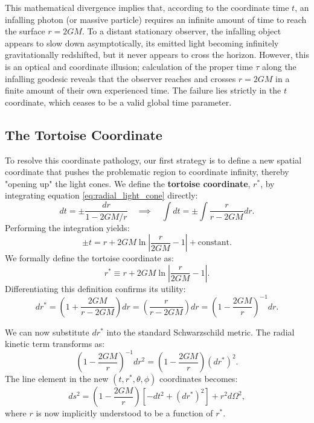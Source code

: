 \documentclass[11pt, a4paper]{report}
\begin{document}
This mathematical divergence implies that, according to the coordinate time $t$, an infalling photon (or massive particle) requires an infinite amount of time to reach the surface $r = 2GM$. To a distant stationary observer, the infalling object appears to slow down asymptotically, its emitted light becoming infinitely gravitationally redshifted, but it never appears to cross the horizon. However, this is an optical and coordinate illusion; calculation of the proper time $\tau$ along the infalling geodesic reveals that the observer reaches and crosses $r = 2GM$ in a finite amount of their own experienced time. The failure lies strictly in the $t$ coordinate, which ceases to be a valid global time parameter.


\subsection{The Tortoise Coordinate}

To resolve this coordinate pathology, our first strategy is to define a new spatial coordinate that pushes the problematic region to coordinate infinity, thereby "opening up" the light cones. We define the \textbf{tortoise coordinate}, $r^{*}$, by integrating equation \eqref{eq:radial_light_cone} directly:
\begin{equation}
dt = \pm \frac{dr}{1 - 2GM/r} \quad \implies \quad \int dt = \pm \int \frac{r}{r - 2GM} dr.
\end{equation}
Performing the integration yields:
\begin{equation}
\pm t = r + 2GM \ln\left| \frac{r}{2GM} - 1 \right| + \text{constant}.
\end{equation}
We formally define the tortoise coordinate as:
\begin{equation}
\label{eq:tortoise_def}
r^{*} \equiv r + 2GM \ln\left| \frac{r}{2GM} - 1 \right|.
\end{equation}
Differentiating this definition confirms its utility:
\begin{equation}
dr^{*} = \left( 1 + \frac{2GM}{r - 2GM} \right) dr = \left( \frac{r}{r - 2GM} \right) dr = \left( 1 - \frac{2GM}{r} \right)^{-1} dr.
\end{equation}

We can now substitute $dr^{*}$ into the standard Schwarzschild metric. The radial kinetic term transforms as:
\begin{equation}
\left( 1 - \frac{2GM}{r} \right)^{-1} dr^{2} = \left( 1 - \frac{2GM}{r} \right) (dr^{*})^{2}.
\end{equation}
The line element in the new $(t, r^{*}, \theta, \phi)$ coordinates becomes:
\begin{equation}
ds^{2} = \left( 1 - \frac{2GM}{r} \right) \left[ -dt^{2} + (dr^{*})^{2} \right] + r^{2} d\Omega^{2},
\end{equation}
where $r$ is now implicitly understood to be a function of $r^{*}$. 
\end{document}
